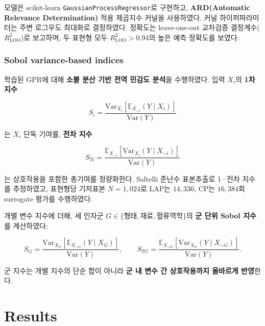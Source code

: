 \documentclass[master,english,final]{kaist-ucs}
\begin{document}
모델은 scikit-learn \texttt{GaussianProcessRegressor}로 구현하고, \textbf{ARD(Automatic Relevance Determination)} 적용 제곱지수 커널을 사용하였다. 커널 하이퍼파라미터는 주변 로그우도 최대화로 결정하였다. 정확도는 leave-one-out 교차검증 결정계수($R^2_\mathrm{LOO}$)로 보고하며, 두 표현형 모두 $R^2_\mathrm{LOO}>0.94$의 높은 예측 정확도를 보였다.

\subsection{Sobol variance-based indices}

학습된 GPR에 대해 \textbf{소볼 분산 기반 전역 민감도 분석}을 수행하였다. 입력 $X_i$의 \textbf{1차 지수}

\begin{equation}
S_i = \frac{\mathrm{Var}_{X_i}\!\left[\mathbb{E}_{X_{\sim i}}(Y\mid X_i)\right]}{\mathrm{Var}(Y)}
\end{equation}

는 $X_i$ 단독 기여를, \textbf{전차 지수}

\begin{equation}
S_{Ti} = \frac{\mathbb{E}_{X_{\sim i}}\!\left[\mathrm{Var}_{X_i}(Y\mid X_{\sim i})\right]}{\mathrm{Var}(Y)}
\end{equation}

는 상호작용을 포함한 총기여를 정량화한다. Saltelli 준난수 표본추출로 1·전차 지수를 추정하였고, 표현형당 기저표본 $N=1{,}024$로 LAP는 $14{,}336$, CP는 $16{,}384$회 surrogate 평가를 수행하였다.

개별 변수 지수에 더해, 세 인자군 $G\in\{\mathrm{형태, 재료, 혈류역학}\}$의 \textbf{군 단위 Sobol 지수}를 계산하였다:

\begin{equation}
S_G = \frac{\mathrm{Var}_{X_G}\!\left[\mathbb{E}_{X_{\sim G}}(Y\mid X_G)\right]}{\mathrm{Var}(Y)}, \qquad S_{TG} = \frac{\mathbb{E}_{X_{\sim G}}\!\left[\mathrm{Var}_{X_G}(Y\mid X_{\sim G})\right]}{\mathrm{Var}(Y)}.
\end{equation}

군 지수는 개별 지수의 단순 합이 아니라 \textbf{군 내 변수 간 상호작용까지 올바르게 반영}한다.


\chapter{Results}
\end{document}
